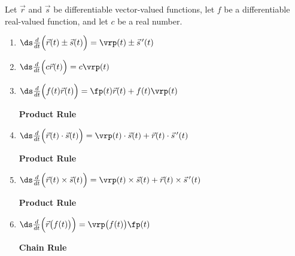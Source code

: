 
{Let $\vec r$ and $\vec s$ be differentiable vector-valued functions, let $f$ be a differentiable real-valued function, and let $c$ be a real number.
\begin{enumerate}
	\item $\ds \frac{d}{dt}\Big(\vec r(t) \pm \vec s(t)\Big) = \vrp(t) \pm \vec s\,'(t)$
	\item $\ds \frac{d}{dt}\Big(c\vec r(t)\Big) = c\vrp(t)$
	\item \parbox{200pt}{$\ds \frac{d}{dt}\Big(f(t)\vec r(t)\Big) = \fp(t)\vec r(t) + f(t)\vrp(t)$} \textbf{Product Rule}
	\item \parbox{200pt}{$\ds \frac{d}{dt}\Big(\vec r(t)\cdot \vec s(t) \Big) = \vrp(t)\cdot \vec s(t) + \vec r(t)\cdot \vec s\,'(t)$} \textbf{Product Rule}
	\item\label{crossprodrule} \parbox{200pt}{$\ds \frac{d}{dt}\Big(\vec r(t)\times \vec s(t) \Big) = \vrp(t)\times \vec s(t) + \vec r(t)\times \vec s\,'(t)$} \textbf{Product Rule}
	\item \parbox{200pt}{$\ds \frac{d}{dt}\Big(\vec r\big(f(t)\big)\Big) = \vrp\big(f(t)\big)\fp(t)$}  \textbf{Chain Rule}
\end{enumerate}}


